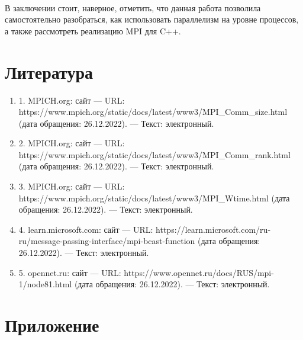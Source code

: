 \documentclass[12pt,a4paper]{article}
\begin{document}
\paragraph{}В заключении стоит, наверное, отметить, что данная работа позволила самостоятельно разобраться, как использовать параллелизм на уровне процессов, а также рассмотреть реализацию MPI для C++.
\part*{Литература}
\begin{enumerate} 
\item 1. MPICH.org: сайт —  URL: https://www.mpich.org/static/docs/latest/www3/MPI\_Comm\_size.html (дата обращения: 26.12.2022). —  Текст: электронный.
\item 2. MPICH.org: сайт —  URL: https://www.mpich.org/static/docs/latest/www3/MPI\_Comm\_rank.html (дата обращения: 26.12.2022). —  Текст: электронный.
\item 3. MPICH.org: сайт —  URL: https://www.mpich.org/static/docs/latest/www3/MPI\_Wtime.html (дата обращения: 26.12.2022). —  Текст: электронный.
\item 4. learn.microsoft.com: сайт —  URL: https://learn.microsoft.com/ru-ru/message-passing-interface/mpi-bcast-function (дата обращения: 26.12.2022). —  Текст: электронный.
\item 5. opennet.ru: сайт —  URL: https://www.opennet.ru/docs/RUS/mpi-1/node81.html (дата обращения: 26.12.2022). —  Текст: электронный.
\end{enumerate} 

\part*{Приложение}
\end{document}
